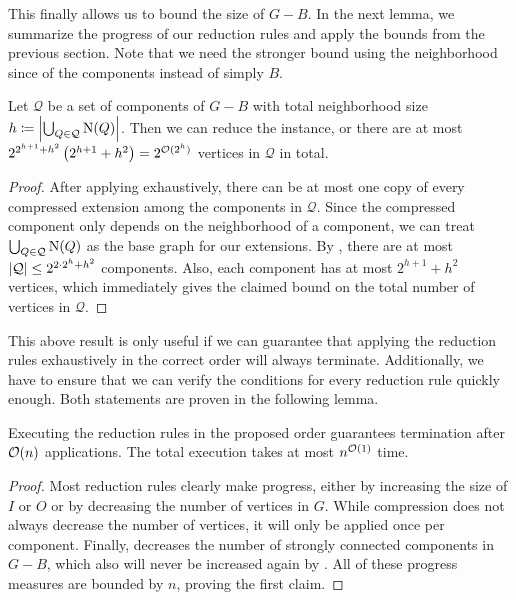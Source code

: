 \begin{theorem}
\begin{lemma}
\begin{theorem}
\begin{lemma}
\begin{reduction*}
\begin{reduction*}
\begin{reduction*}
\begin{reduction*}
This finally allows us to bound the size of $G-B$. In the next lemma, we summarize the progress of our reduction rules and apply the bounds from the previous section. Note that we need the stronger bound using the neighborhood since of the components instead of simply $B$.

\iflong
\begin{lemma}
\else
\begin{lemma}[$\star$]
\fi
\label{lem:scc_all_reductions}
  Let $\mathcal{Q}$ be a set of components of $G - B$ with total neighborhood size $h \coloneqq \abs{\bigcup_{Q \in \mathcal{Q}} \nei{Q}}$. Then we can reduce the instance, or there are at most $2^{2^{h+1} + h^2}\left(2^{h+1} + h^2\right) = 2^{\mathcal{O}(2^h)}$ vertices in $\mathcal{Q}$ in total.
\end{lemma}
\iflong
\begin{proof}
  After applying  exhaustively, there can be at most one copy of every compressed extension among the components in $\mathcal{Q}$.
  Since the compressed component only depends on the neighborhood of a component, we can treat $\bigcup_{Q \in \mathcal{Q}} \operatorname{N}({Q})$ as the base graph for our extensions. By , there are at most $\abs{\mathcal{Q}} \le 2^{2\cdot 2^h + h^2}$ components. Also, each component has at most $2^{h+1} + h^2$ vertices, which immediately gives the claimed bound on the total number of vertices in $\mathcal{Q}$.
\end{proof}
\fi

\iflong
This above result is only useful if we can guarantee that applying the reduction rules exhaustively in the correct order will always terminate. Additionally, we have to ensure that we can verify the conditions for every reduction rule quickly enough. Both statements are proven in the following lemma.

\iflong
\begin{lemma}
\else
\begin{lemma}[$\star$]
\fi
\label{lem:red_rules_poly}
  Executing the reduction rules in the proposed order guarantees termination after $\mathcal{O}(n)$ applications. The total execution takes at most $n^{\mathcal{O}(1)}$ time.
\end{lemma}
\iflong
\begin{proof}
  Most reduction rules clearly make progress, either by increasing the size of $I$ or $O$ or by decreasing the number of vertices in $G$. While compression does not always decrease the number of vertices, it will only be applied once per component. Finally,  decreases the number of strongly connected components in $G-B$, which also will never be increased again by . All of these progress measures are bounded by $n$, proving the first claim.


\end{proof}
\end{lemma}
\end{lemma}
\end{reduction*}
\end{reduction*}
\end{reduction*}
\end{reduction*}
\end{lemma}
\end{theorem}
\end{lemma}
\end{theorem}
